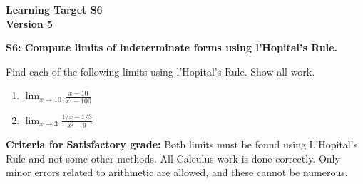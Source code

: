 \documentclass[10pt]{article}
\begin{document}
	\vspace*{0in}

		\begin{center}
			\textbf{Learning Target S6 \\
			Version 5} 
		\end{center}


\begin{framed}
	\textbf{S6: Compute limits of indeterminate forms using l'Hopital's Rule.}
\end{framed}

Find each of the following limits using l'Hopital's Rule. Show all work. 

\begin{enumerate}
    \item $\displaystyle{ \lim_{x \rightarrow 10} \frac{x-10}{x^2-100}}$
    \item $\displaystyle{  \lim_{x \rightarrow 3} \frac{ 1/x - 1/3 }{ x^2-9 }   }$
\end{enumerate}

\vfill


\begin{small}
    \begin{framed}
        	\textbf{Criteria for Satisfactory grade:} Both limits must be found using L'Hopital's Rule and not some other methods. All Calculus work is done correctly. Only minor errors related to arithmetic are allowed, and these cannot be numerous. 
    \end{framed}

\end{small}
\end{document}

